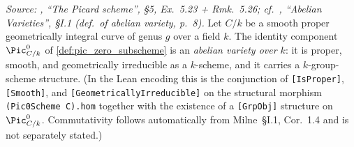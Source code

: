 \begin{theorem}\leanok
  \label{thm:pic_zero_is_abelian_variety}

  \textit{Source: \cite{kleiman-picard}, ``The Picard scheme'', \S 5,
  Ex.~5.23 + Rmk.~5.26; cf.\ \cite{milne-av}, ``Abelian Varieties'',
  \S I.1 (def.\ of abelian variety, p.~8).}
  Let \(C/k\) be a smooth proper geometrically integral curve of genus
  \(g\) over a field \(k\). The identity component \(\Pic^0_{C/k}\) of
  \cref{def:pic_zero_subscheme} is an \emph{abelian variety over
  \(k\)}: it is proper, smooth, and geometrically irreducible as a
  \(k\)-scheme, and it carries a \(k\)-group-scheme structure. (In the
  Lean encoding this is the conjunction of
  \texttt{[IsProper]}, \texttt{[Smooth]}, and
  \texttt{[GeometricallyIrreducible]} on the structural morphism
  \texttt{(Pic0Scheme C).hom} together with the existence of a
  \texttt{[GrpObj]} structure on \(\Pic^0_{C/k}\). Commutativity
  follows automatically from Milne~\S I.1, Cor.~1.4 and is not
  separately stated.)
\end{theorem}

